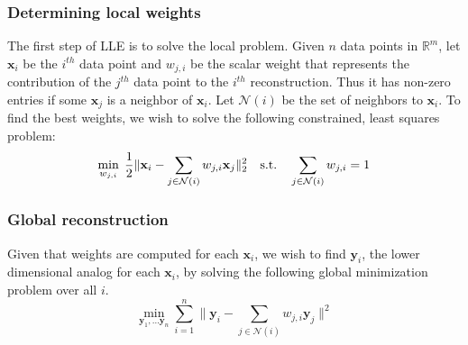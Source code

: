 \documentclass[11pt]{article}
\begin{document}
\subsubsection*{Determining local weights}
The first step of LLE is to solve the local problem. Given $n$ data points in $\mathbb{R}^m$, let $\mathbf{x}_i$ be the $i^{th}$ data point and $w_{j,i}$ be the scalar weight that represents the contribution of the $j^{th}$ data point to the $i^{th}$ reconstruction. Thus it has non-zero entries if some $\mathbf{x}_j$ is a neighbor of $\mathbf{x}_i$. Let $\mathcal{N}(i)$ be the set of neighbors to $\mathbf{x}_i$. To find the best weights, we wish to solve the following constrained, least squares problem:
\[
\min_{w_{j,i}} \; \frac{1}{2} \| \mathbf{x}_i - \sum_{j \in \mathcal{N}(i)} w_{j,i}\mathbf{x}_j \|_2^2 \quad \text{s.t.} \quad  \sum_{j \in \mathcal{N}(i)}w_{j,i} = 1 \\
\]

\subsubsection*{Global reconstruction}
Given that weights are computed for each $\mathbf{x}_i$, we wish to find $\mathbf{y}_i$, the lower dimensional analog for each $\mathbf{x}_i$, by solving the following global minimization problem over all $i$.
\[\min_{\mathbf{y}_1, \ldots \mathbf{y}_n} \sum_{i=1}^n \| \mathbf{y}_i - \sum_{j \in \mathcal{N}(i)} w_{j,i} \mathbf{y}_j \| ^2 \]
\end{document}

